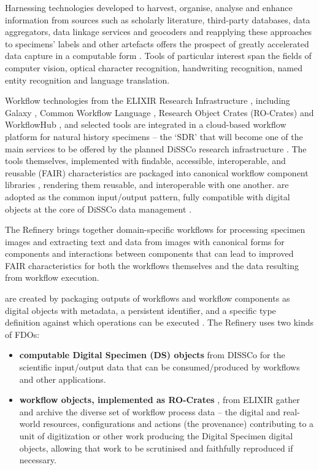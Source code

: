 Harnessing technologies developed to harvest, organise, analyse and
enhance information from sources such as scholarly literature,
third-party databases, data aggregators, data linkage services and
geocoders and reapplying these approaches to specimens' labels and other
artefacts offers the prospect of greatly accelerated data capture in a
computable form \cite{Owen 2020}. Tools of particular interest span the fields
of computer vision, optical character recognition, handwriting
recognition, named entity recognition and language translation.

Workflow technologies from the ELIXIR Research Infrastructure \cite{Harrow 2021},
including Galaxy \cite{Afgan 2018}, Common Workflow Language \cite{Crusoe 2022}, Research
Object Crates (RO-Crates) \cite{Ó Carragáin 2019a,Soiland-Reyes 2022a} and WorkflowHub \cite{Goble 2021}, and
selected tools are integrated in a cloud-based workflow platform for
natural history specimens -- the `\acrlong{SDR}' \cite{Walton 2020a} that
will become one of the main services to be offered by the planned DiSSCo
research infrastructure \cite{Addink 2019}. The tools themselves, implemented with
findable, accessible, interoperable, and reusable (FAIR) characteristics
\cite{Wilkinson 2016} are packaged into canonical workflow component libraries
\cite{Wittenburg 2022b}, rendering them reusable, and interoperable with one another.
are adopted as the common input/output pattern,
fully compatible with digital objects at the core of DiSSCo data
management \cite{Hardisty 2019b}.

The Refinery brings together domain-specific workflows for processing
specimen images and extracting text and data from images with canonical
forms for components and interactions between components that can lead
to improved FAIR characteristics for both the workflows themselves and
the data resulting from workflow execution.

are created by packaging outputs of workflows
and workflow components as digital objects with metadata, a persistent
identifier, and a specific type definition against which operations can
be executed \cite{De Smedt 2020}. The Refinery uses two kinds of FDOs:

\begin{itemize}
\item
  \textbf{computable Digital Specimen (DS) objects} \cite{Hardisty 2020} from DISSCo
  for the scientific input/output data that can be consumed/produced by
  workflows and other applications.
\item
  \textbf{workflow objects, implemented as RO-Crates} \cite{Soiland-Reyes 2022a}, from
  ELIXIR gather and archive the diverse set of workflow process data --
  the digital and real-world resources, configurations and actions (the
  provenance) contributing to a unit of digitization or other work
  producing the Digital Specimen digital objects, allowing that work to
  be scrutinised and faithfully reproduced if necessary.
\end{itemize}

